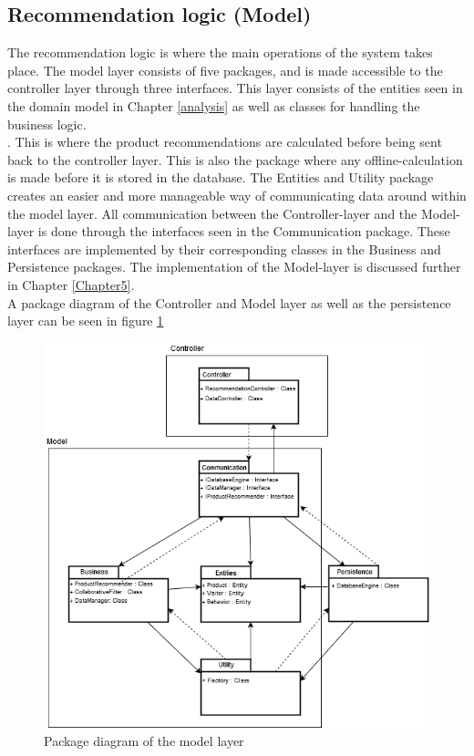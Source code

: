 \subsection{Recommendation logic (Model)}
The recommendation logic is where the main operations of the system takes place. The model layer consists of five packages, and is made accessible to the controller layer through three interfaces. This layer consists of the entities seen in the domain model in Chapter \ref{analysis} as well as classes for handling the business logic. \\. This is where the product recommendations are calculated before being sent back to the controller layer. This is also the package where any offline-calculation is made before it is stored in the database. The Entities and Utility package creates an easier and more manageable way of communicating data around within the model layer. All communication between the Controller-layer and the Model-layer is done through the interfaces seen in the Communication package. These interfaces are implemented by their corresponding classes in the Business and Persistence packages. The implementation of the Model-layer is discussed further in Chapter \ref{Chapter5}. \\
A package diagram of the Controller and Model layer as well as the persistence layer can be seen in figure \ref{fig:PackageDiagram}

\begin{figure}[H]
	\centering
	\includegraphics[width=.8\linewidth]{Figures/PackageDiagram.png}
	\caption{Package diagram of the model layer}
	\label{fig:PackageDiagram}
\end{figure}

